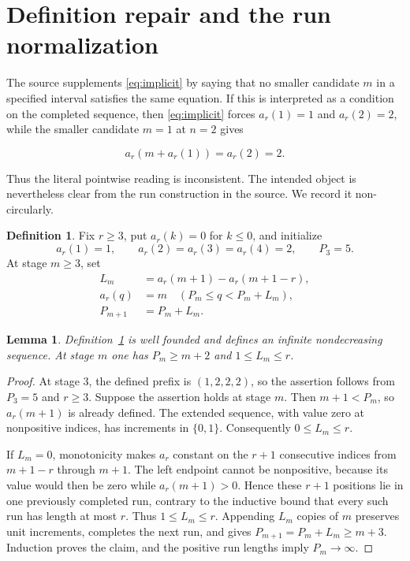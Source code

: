 \documentclass[11pt]{amsart}
\newtheorem{lemma}[theorem]{Lemma}
\theoremstyle{definition}
\newtheorem{definition}[theorem]{Definition}
\begin{document}
\section{Definition repair and the run normalization}\label{sec:definition}

The source supplements \eqref{eq:implicit} by saying that no smaller
candidate $m$ in a specified interval satisfies the same equation.  If this
is interpreted as a condition on the completed sequence, then
\eqref{eq:implicit} forces $a_r(1)=1$ and $a_r(2)=2$, while the smaller
candidate $m=1$ at $n=2$ gives

\[
 a_r(m+a_r(1))=a_r(2)=2.
\]

Thus the literal pointwise reading is inconsistent.  The intended object is
nevertheless clear from the run construction in the source.  We record it
non-circularly.

\begin{definition}\label{def:run}
Fix $r\geq3$, put $a_r(k)=0$ for $k\leq0$, and initialize
\[
 a_r(1)=1,\qquad a_r(2)=a_r(3)=a_r(4)=2,\qquad P_3=5.
\]
At stage $m\geq3$, set
\begin{align*}
 L_m&=a_r(m+1)-a_r(m+1-r),\\
 a_r(q)&=m\quad(P_m\leq q<P_m+L_m),\\
 P_{m+1}&=P_m+L_m.
\end{align*}
\end{definition}

\begin{lemma}\label{lem:well-founded}
Definition~\ref{def:run} is well founded and defines an infinite
nondecreasing sequence.  At stage $m$ one has $P_m\geq m+2$ and
$1\leq L_m\leq r$.
\end{lemma}

\begin{proof}
At stage $3$, the defined prefix is $(1,2,2,2)$, so the assertion follows
from $P_3=5$ and $r\geq3$.  Suppose the assertion holds at stage $m$.
Then $m+1<P_m$, so $a_r(m+1)$ is already defined.  The extended sequence,
with value zero at nonpositive indices, has increments in $\{0,1\}$.
Consequently $0\leq L_m\leq r$.

If $L_m=0$, monotonicity makes $a_r$ constant on the $r+1$ consecutive
indices from $m+1-r$ through $m+1$.  The left endpoint cannot be
nonpositive, because its value would then be zero while $a_r(m+1)>0$.
Hence these $r+1$ positions lie in one previously completed run, contrary
to the inductive bound that every such run has length at most $r$.
Thus $1\leq L_m\leq r$.  Appending $L_m$ copies of $m$ preserves unit
increments, completes the next run, and gives
$P_{m+1}=P_m+L_m\geq m+3$.  Induction proves the claim, and the positive
run lengths imply $P_m\to\infty$.
\end{proof}
\end{document}
